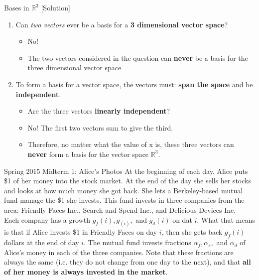 \begin{frame}{Bases in $\mathbb{R}^3$ [Solution]}
    \begin{enumerate}
        \color{blue}
        \item<blue@1-> Can \textit{two vectors} ever be a basis for a \textbf{3 dimensional vector space}?
        \begin{itemize}
            \color{blue}
            \item<blue@1-> No! 
            \item<blue@1-> The two vectors considered in the question can \textbf{never} be a basis for the three dimensional vector space
        \end{itemize}
        \item<blue@1-> To form a basis for a vector space, the vectors must: \textbf{span the space} and be  \textbf{independent}.
        \begin{itemize}
            \color{blue}
            \item<blue@1-> Are the three vectors \textbf{linearly independent}?
            \item<blue@1-> No! The first two vectors sum to give the third.
            \item<blue@1-> Therefore, no matter what the value of x is, these three vectors can \textbf{never} form a basis for the vector space $\mathbb{R}^3$.
        \end{itemize}
    \end{enumerate}
\end{frame}

\begin{frame}{Spring 2015 Midterm 1: Alice's Photos}
    At the beginning of each day, Alice puts \$1 of her money into the stock market. At the end of the day she sells her stocks and looks at how much money she got back. She lets a Berkeley-based mutual fund manage the \$1 she invests. This fund invests in three companies from the area: Friendly Faces Inc., Search and Spend Inc., and Delicious Devices Inc.\\[2ex]
    Each company has a growth $g_f(i), g_(i),$ and $g_d(i)$ on dat $i$. What that means is that if Alice invests \$1 in Friendly Faces on day $i$, then she gets back $g_f(i)$ dollars at the end of day $i$. The mutual fund invests fractions $\alpha_f, \alpha_s,$ and $\alpha_d$ of Alice's money in each of the three companies. Note that these fractions are always the same (i.e. they do not change from one day to the next), and that \textbf{all of her money is always invested in the market}.
\end{frame}

